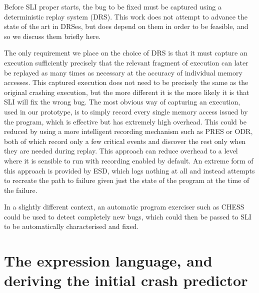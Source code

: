 \documentclass[10pt,a4paper,twocolumn]{article}
\begin{document}
Before SLI proper starts, the bug to be fixed must be captured using a
deterministic replay system (DRS).  This work does not attempt to
advance the state of the art in DRSes, but does depend on them in
order to be feasible, and so we discuss them briefly here.

The only requirement we place on the choice of DRS is that it must
capture an execution sufficiently precisely that the relevant fragment
of execution can later be replayed as many times as necessary at the
accuracy of individual memory accesses.  This captured execution does
not need to be precisely the same as the original crashing execution,
but the more different it is the more likely it is that SLI will fix
the wrong bug.  The most obvious way of capturing an execution, used
in our prototype, is to simply record every single memory access
issued by the program, which is effective but has extremely high
overhead.  This could be reduced by using a more intelligent recording
mechanism such as PRES\cite{Park2009} or ODR\cite{Altekar2009}, both
of which record only a few critical events and discover the rest only
when they are needed during replay.  This approach can reduce overhead
to a level where it is sensible to run with recording enabled by
default.  An extreme form of this approach is provided by
ESD\cite{Zamfir2010}, which logs nothing at all and instead attempts
to recreate the path to failure given just the state of the program at
the time of the failure.

In a slightly different context, an automatic program exerciser such
as CHESS\cite{Musuvathi2008} could be used to detect completely new
bugs, which could then be passed to SLI to be automatically
characterised and fixed.

\section{The expression language, and deriving the initial crash predictor}
\end{document}
